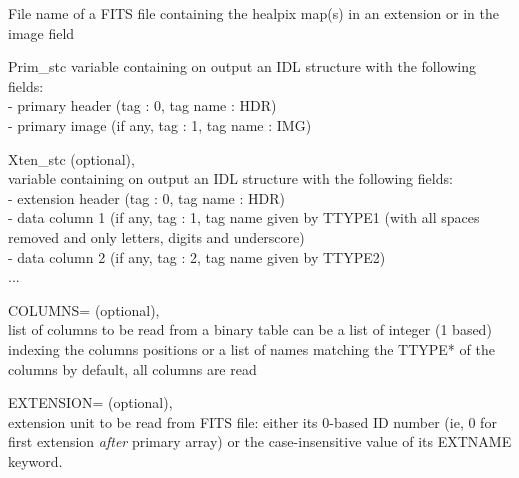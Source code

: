 \begin{qualifiers}
  \begin{qulist}{} %
 	\item[{File}]  
          name of a FITS file containing 
               the healpix map(s) in an extension or in the image field 

 	\item[{Prim\_stc}]   
	variable containing on output an IDL structure with the following fields: \\
		- primary header (tag : 0, tag name : HDR) \\
		- primary image (if any, tag : 1, tag name : IMG)

       \item[{Xten\_stc}]  
		  (optional), \\
	variable containing on output an IDL structure with the following fields: \\
		- extension header (tag : 0, tag name : HDR) \\
		- data column 1 (if any, tag : 1, tag name given by TTYPE1 (with all
                    spaces removed and only letters, digits and underscore) \\
		- data column 2 (if any, tag : 2, tag name given by TTYPE2)  \\
		...

      \item[{COLUMNS=}]  
		(optional), \\
        list of columns to be read from a binary table 
        can be a list of integer (1 based) indexing the columns positions
        or a list of names matching the TTYPE* of the columns
        by default, all columns are read

       \item[{EXTENSION=}]  
		(optional), \\
	extension unit to be read from FITS file: 
 either its 0-based ID number (ie, 0 for first extension {\em after} primary array) 
 or the case-insensitive value of its EXTNAME keyword.
  \end{qulist}
\end{qualifiers}

